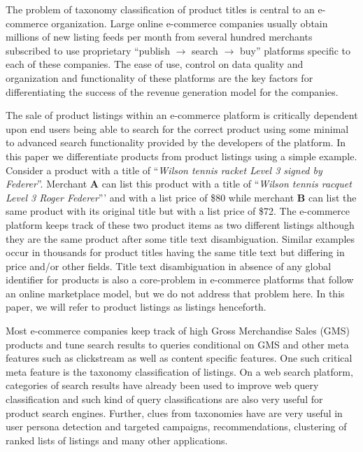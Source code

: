 The problem of taxonomy classification of product titles is central to an e-commerce organization. 
Large online e-commerce companies usually obtain millions of new listing feeds per month from several hundred merchants subscribed to use proprietary ``publish $\rightarrow$ search $\rightarrow$ buy'' platforms specific to each of these companies. 
The ease of use, control on data quality and organization and functionality of these platforms are the key factors for differentiating the success of the revenue generation model for the companies.

The sale of product listings within an e-commerce platform is critically dependent upon end users being able to search for the correct product using some minimal to advanced search functionality provided by the developers of the platform. 
In this paper we differentiate products from product listings using a simple example. 
Consider a product with a title of ``\textit{Wilson tennis racket Level 3 signed by Federer}''. 
Merchant \textbf{A} can list this product with a title of ``\textit{Wilson tennis racquet Level 3 Roger Federer}''' and with a list price of \$80 while merchant \textbf{B} can list the same product with its original title but with a list price of \$72.
The e-commerce platform keeps track of these two product items as two different listings although they are the same product after some title text disambiguation.
Similar examples occur in thousands for product titles having the same title text but differing in price and/or other fields.
Title text disambiguation in absence of any global identifier for products is also a core-problem in e-commerce platforms that follow an online marketplace model, but we do not address that problem here.
In this paper, we will refer to product listings as listings henceforth. 

Most e-commerce companies keep track of high Gross Merchandise Sales (GMS) products and tune search results to queries conditional on GMS and other meta features such as clickstream as well as  content specific features.
One such critical meta feature is the taxonomy classification of listings.
On a web search platform, categories of search results have already been used to improve web query classification \cite{Ganti10} and such kind of query classifications are also very useful for product search engines.
Further, clues from taxonomies have are very useful in user persona detection and targeted campaigns, recommendations, clustering of  ranked lists of listings and many other applications.

